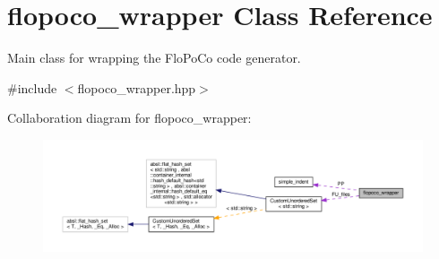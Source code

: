 \hypertarget{classflopoco__wrapper}{}\section{flopoco\+\_\+wrapper Class Reference}
\label{classflopoco__wrapper}


Main class for wrapping the Flo\+Po\+Co code generator.  




{\ttfamily \#include $<$flopoco\+\_\+wrapper.\+hpp$>$}



Collaboration diagram for flopoco\+\_\+wrapper\+:
\nopagebreak
\begin{figure}[H]
\begin{center}
\leavevmode
\includegraphics[width=350pt]{d6/d9e/classflopoco__wrapper__coll__graph}
\end{center}
\end{figure}
